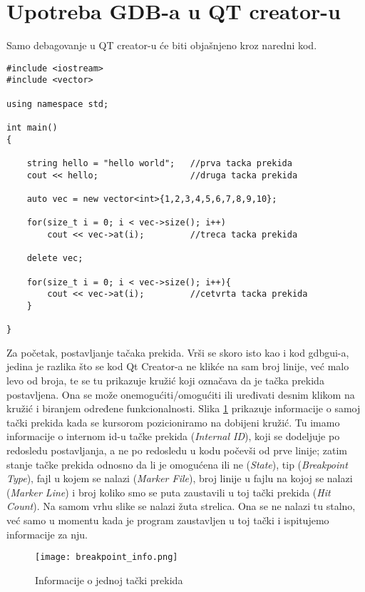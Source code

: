 \documentclass[a4paper]{article}
\begin{document}
\section{Upotreba GDB-a u QT creator-u}
\label{upotrebaQT}
Samo debagovanje u QT creator-u će biti objašnjeno kroz naredni kod.

\begin{lstlisting}[caption={Primer jednostavnog programa za prikaz rada GDB-a u Qt Creator-u},frame=single, label=simple]
#include <iostream>
#include <vector>

using namespace std;

int main()
{

    string hello = "hello world";   //prva tacka prekida
    cout << hello;                  //druga tacka prekida

    auto vec = new vector<int>{1,2,3,4,5,6,7,8,9,10};

    for(size_t i = 0; i < vec->size(); i++)
        cout << vec->at(i);         //treca tacka prekida

    delete vec;

    for(size_t i = 0; i < vec->size(); i++){
        cout << vec->at(i);         //cetvrta tacka prekida
    }

}
\end{lstlisting}

Za početak, postavljanje tačaka prekida. Vrši se skoro isto kao i kod gdbgui-a, jedina je razlika što se kod Qt Creator-a ne klikće na sam broj linije,
već malo levo od broja, te se tu prikazuje kružić koji označava da je
tačka prekida postavljena. Ona se može onemogućiti/omogućiti ili uređivati desnim klikom na kružić i biranjem određene funkcionalnosti.
Slika \ref{fig:point_info} prikazuje informacije o samoj tački prekida kada se
kursorom pozicioniramo na dobijeni kružić. Tu imamo informacije o internom id-u tačke prekida (\textit{Internal ID}), koji se dodeljuje
po redosledu postavljanja, a ne po redosledu u kodu počevši od prve linije; zatim stanje tačke prekida
odnosno da li je omogućena ili ne (\textit{State}), tip (\textit{Breakpoint Type}),
fajl u kojem se nalazi (\textit{Marker File}), broj linije u fajlu na kojoj se nalazi (\textit{Marker Line})
i broj koliko smo se puta zaustavili u toj tački prekida (\textit{Hit Count}).
Na samom vrhu slike se nalazi žuta strelica. Ona se ne nalazi tu stalno, već samo u momentu kada je program 
zaustavljen u toj tački i ispitujemo informacije za nju.

\begin{figure}[h!]
\begin{center}
\texttt{[image: breakpoint\_info.png]}
\end{center}
\caption{Informacije o jednoj tački prekida}
\label{fig:point_info}
\end{figure}
\end{document}
